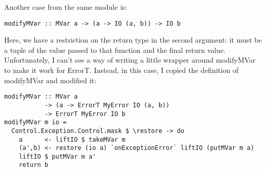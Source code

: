 Another case from the same module is:

\begin{lstlisting}
modifyMVar :: MVar a -> (a -> IO (a, b)) -> IO b
\end{lstlisting}

Here, we have a restriction on the return type in the second argument: it must be a tuple of the value passed to that function and the final return value. Unfortunately, I can't see a way of writing a little wrapper around modifyMVar to make it work for ErrorT. Instead, in this case, I copied the definition of modifyMVar and modified it:

\begin{lstlisting}
modifyMVar :: MVar a
           -> (a -> ErrorT MyError IO (a, b))
           -> ErrorT MyError IO b
modifyMVar m io =
  Control.Exception.Control.mask $ \restore -> do
    a      <- liftIO $ takeMVar m
    (a',b) <- restore (io a) `onExceptionError` liftIO (putMVar m a)
    liftIO $ putMVar m a'
    return b
\end{lstlisting}